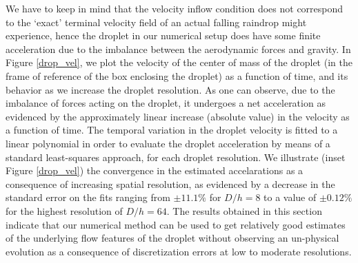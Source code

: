We have to keep in mind that the velocity inflow condition 
does not correspond to the `exact' terminal velocity 
field of an actual falling raindrop might experience, 
hence the droplet in our numerical setup does have some 
finite acceleration due to the imbalance 
between the aerodynamic forces and gravity. 
In Figure \ref{drop_vel}, we plot the velocity of 
the center of mass of the droplet (in the frame of reference 
of the box enclosing the droplet) as a function of time, 
and its behavior as we increase the droplet resolution. 
As one can observe, due to the imbalance of forces acting on the droplet, 
it undergoes a net acceleration as evidenced by the approximately 
linear increase (absolute value) in the velocity as a function of time. 
The temporal variation in the droplet velocity is fitted to a 
linear polynomial in order to evaluate the droplet acceleration 
by means of a standard least-squares approach, for each droplet resolution. 
We illustrate (inset Figure \ref{drop_vel}) the convergence in the estimated 
accelarations as a consequence of increasing spatial resolution, 
as evidenced by a decrease in the standard error on the fits 
ranging from $\pm 11.1 \%$ for $D/h = 8$ to a value of $\pm 0.12 \%$ 
for the highest resolution of $D/h = 64$. 
The results obtained in this section indicate that 
our numerical method can be used to get relatively good 
estimates of the underlying flow features of the droplet 
without observing an un-physical evolution as a consequence 
of discretization errors at low to moderate resolutions.           


